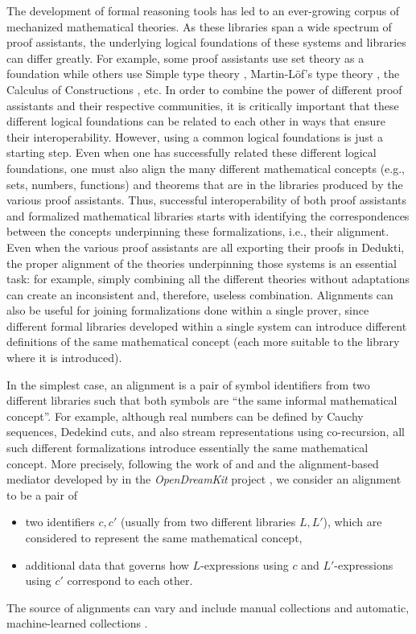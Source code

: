 The development of formal reasoning tools has led to an ever-growing
corpus of mechanized mathematical theories. As these libraries span a
wide spectrum of proof assistants, the underlying logical foundations
of these systems and libraries can differ greatly. For example, some
proof assistants use set theory as a foundation while others use
Simple type theory \cite{Church40}, Martin-L\"of's type theory
\cite{Martin-Lof84}, the Calculus of Constructions
\cite{CoquandHuet88}, etc.  In order to combine the power of different
proof assistants and their respective communities, it is critically
important that these different logical foundations can be related to
each other in ways that ensure their interoperability. However, using
a common logical foundations is just a starting step. Even when one
has successfully related these different logical foundations, one must
also align the many different mathematical concepts (e.g., sets,
numbers, functions) and theorems that are in the libraries produced by
the various proof assistants. Thus, successful interoperability of
both proof assistants and formalized mathematical libraries starts
with identifying the correspondences between the concepts underpinning
these formalizations, i.e., their alignment. Even when the various
proof assistants are all exporting their proofs in Dedukti, the proper
alignment of the theories underpinning those systems is an essential
task: for example, simply combining all the different theories without
adaptations can create an inconsistent and, therefore, useless
combination.
%
Alignments can also be useful for joining formalizations done within a
single prover, since different formal libraries developed within a
single system can introduce different definitions of the same
mathematical concept (each more suitable to the library where it is
introduced).

In the simplest case, an alignment is a pair of symbol identifiers
from two different libraries such that both symbols are ``the same
informal mathematical concept''. For example, although real numbers
can be defined by Cauchy sequences, Dedekind cuts, and also stream
representations using co-recursion, all such different formalizations
introduce essentially the same mathematical concept. More precisely,
following the work of  and 
\cite{GKKMR:alignments:17} and the alignment-based mediator developed
by  in the {\em OpenDreamKit} project \cite{DBLP:conf/mkm/DehayeIKKLMPRTW16}, we
consider an alignment to be a pair of
\begin{itemize}
  \item two identifiers $c,c'$ (usually from two different libraries
    $L,L'$), which are considered to represent the same mathematical
    concept,
  \item additional data that governs how $L$-expressions using $c$ and
    $L'$-expressions using $c'$ correspond to each other.
\end{itemize}
The source of alignments can vary and include manual collections
\cite{MRLR:alignments:17} and automatic, machine-learned collections
\cite{GAUTHIER201989}.

